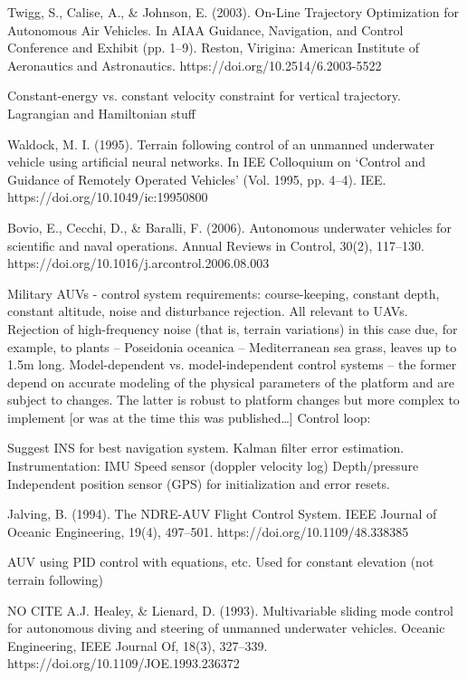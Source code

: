 \cite{Twigg2003}
Twigg, S., Calise, A., \& Johnson, E. (2003). On-Line Trajectory Optimization for Autonomous Air Vehicles. In AIAA Guidance, Navigation, and Control Conference and Exhibit (pp. 1–9). Reston, Virigina: American Institute of Aeronautics and Astronautics. https://doi.org/10.2514/6.2003-5522

Constant-energy vs. constant velocity constraint for vertical trajectory.
Lagrangian and Hamiltonian stuff

\cite{Waldock1995}
Waldock, M. I. (1995). Terrain following control of an unmanned underwater vehicle using artificial neural networks. In IEE Colloquium on `Control and Guidance of Remotely Operated Vehicles’ (Vol. 1995, pp. 4–4). IEE. https://doi.org/10.1049/ic:19950800

\cite{Bovio2006}
Bovio, E., Cecchi, D., \& Baralli, F. (2006). Autonomous underwater vehicles for scientific and naval operations. Annual Reviews in Control, 30(2), 117–130. https://doi.org/10.1016/j.arcontrol.2006.08.003

Military AUVs - control system requirements: course-keeping, constant depth, constant altitude, noise and disturbance rejection. All relevant to UAVs.
Rejection of high-frequency noise (that is, terrain variations) in this case due, for example, to plants -- Poseidonia oceanica -- Mediterranean sea grass, leaves up to 1.5m long.
Model-dependent vs. model-independent control systems -- the former depend on accurate modeling of the physical parameters of the platform and are subject to changes. The latter is robust to platform changes but more complex to implement [or was at the time this was published…]
Control loop:

Suggest INS for best navigation system.
Kalman filter error estimation.
Instrumentation:
IMU
Speed sensor (doppler velocity log)
Depth/pressure
Independent position sensor (GPS) for initialization and error resets.

\cite{Jalving1994}
Jalving, B. (1994). The NDRE-AUV Flight Control System. IEEE Journal of Oceanic Engineering, 19(4), 497–501. https://doi.org/10.1109/48.338385

AUV using PID control with equations, etc.
Used for constant elevation (not terrain following)

NO CITE
A.J. Healey, \& Lienard, D. (1993). Multivariable sliding mode control for autonomous diving and steering of unmanned underwater vehicles. Oceanic Engineering, IEEE Journal Of, 18(3), 327–339. https://doi.org/10.1109/JOE.1993.236372

